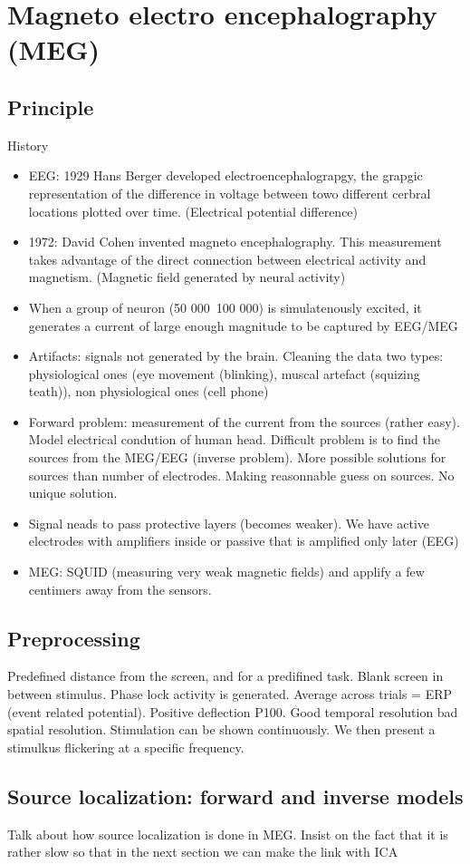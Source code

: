 \section{Magneto electro encephalography (MEG)}
\subsection{Principle}
History
\begin{itemize}
  \item EEG: 1929 Hans Berger developed electroencephalograpgy, the grapgic
    representation of the difference in voltage between towo different cerbral
    locations plotted over time. (Electrical potential difference)
    \item 1972: David Cohen invented magneto encephalography. This measurement
      takes advantage of the direct connection between electrical activity and
      magnetism. (Magnetic field generated by neural activity)

      \item When a group of neuron (50 000~100 000) is simulatenously excited, it generates a current
      of large enough magnitude to be captured by EEG/MEG
    \item Artifacts: signals not generated by the brain. Cleaning the data two types: physiological ones (eye movement (blinking), muscal artefact
      (squizing teath)), non physiological ones (cell phone) 
     \item Forward problem: measurement of the current from the sources (rather
       easy). Model electrical condution of human head.  Difficult problem is to
       find the sources from the MEG/EEG (inverse problem). More possible
       solutions for sources than number of electrodes.
       Making reasonnable guess on sources. No unique solution.

     \item Signal neads to pass protective layers (becomes weaker). We have
       active electrodes with amplifiers inside or passive that is amplified
       only later (EEG)
     \item MEG: SQUID (measuring very weak magnetic fields) and applify a few centimers away from the sensors.
      
\end{itemize}
\subsection{Preprocessing}
Predefined distance from the screen, and for a predifined task. Blank screen in
between stimulus. Phase lock activity  is generated. Average across trials = ERP
(event related potential). Positive deflection P100.
Good temporal resolution bad spatial resolution.
Stimulation can be shown continuously. We then present a stimulkus flickering at
a specific frequency.
\subsection{Source localization: forward and inverse models}
Talk about how source localization is done in MEG. Insist on the fact that it is
rather slow so that in the next section we can make the link with ICA
